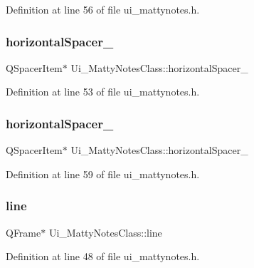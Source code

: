 Definition at line 56 of file ui\+\_\+mattynotes.\+h.

\hypertarget{classUi__MattyNotesClass_ae061dfb9d8a6a4af88b1d97c4c9a50e6}{}\label{classUi__MattyNotesClass_ae061dfb9d8a6a4af88b1d97c4c9a50e6} 
\subsubsection{\texorpdfstring{horizontal\+Spacer\+\_}{horizontalSpacer\_7}}
{\footnotesize\ttfamily Q\+Spacer\+Item$\ast$ Ui\+\_\+\+Matty\+Notes\+Class\+::horizontal\+Spacer\+\_}



Definition at line 53 of file ui\+\_\+mattynotes.\+h.

\hypertarget{classUi__MattyNotesClass_a715fcf11e482f09362cd1403a60ad8cb}{}\label{classUi__MattyNotesClass_a715fcf11e482f09362cd1403a60ad8cb} 
\subsubsection{\texorpdfstring{horizontal\+Spacer\+\_}{horizontalSpacer\_8}}
{\footnotesize\ttfamily Q\+Spacer\+Item$\ast$ Ui\+\_\+\+Matty\+Notes\+Class\+::horizontal\+Spacer\+\_}



Definition at line 59 of file ui\+\_\+mattynotes.\+h.

\hypertarget{classUi__MattyNotesClass_acd1c3f25052cc5661975bbfb7b183b35}{}\label{classUi__MattyNotesClass_acd1c3f25052cc5661975bbfb7b183b35} 
\subsubsection{\texorpdfstring{line}{line}}
{\footnotesize\ttfamily Q\+Frame$\ast$ Ui\+\_\+\+Matty\+Notes\+Class\+::line}



Definition at line 48 of file ui\+\_\+mattynotes.\+h.

